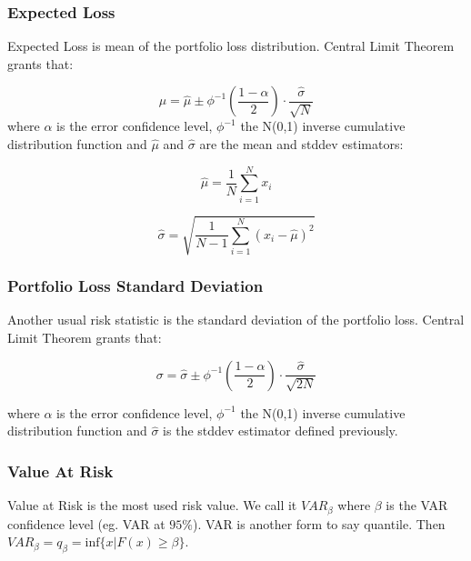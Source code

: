 \documentclass[a4paper,12pt,final]{article}
\begin{document}
\subsubsection{Expected Loss}
Expected Loss is mean of the portfolio loss distribution.
Central Limit Theorem \cite{stats:schaum} grants that:

\begin{displaymath}
\mu = \widehat{\mu} \pm \phi^{-1}\left(\frac{1-\alpha}{2}\right) \cdot \frac{\widehat{\sigma}}{\sqrt{N}}
\end{displaymath}
where $\alpha$ is the error confidence level, $\phi^{-1}$ the N(0,1) inverse 
cumulative distribution function and $\widehat{\mu}$ and $\widehat{\sigma}$ are 
the mean and stddev estimators:

\begin{displaymath}
\widehat{\mu} = \frac{1}{N} \sum_{i=1}^{N} x_i
\end{displaymath}

\begin{displaymath}
\widehat{\sigma} =
\sqrt{\frac{1}{N-1} \sum_{i=1}^{N} \left( x_i - \widehat{\mu} \right)^2}
\end{displaymath}

\subsubsection{Portfolio Loss Standard Deviation}
Another usual risk statistic is the standard deviation of the portfolio loss.
Central Limit Theorem \cite{stats:schaum} grants that:

\begin{displaymath}
\sigma = \widehat{\sigma} \pm \phi^{-1}\left(\frac{1-\alpha}{2}\right) \cdot \frac{\widehat{\sigma}}{\sqrt{2N}}
\end{displaymath}

where $\alpha$ is the error confidence level, $\phi^{-1}$ the N(0,1) inverse 
cumulative distribution function and $\widehat{\sigma}$ is the stddev estimator
defined previously.

\subsubsection{Value At Risk}
Value at Risk \cite{var:jorion} is the most used risk value. We call it 
$VAR_{\beta}$ where $\beta$ is the VAR confidence level (eg. VAR at $95\%$).
VAR is another form to say quantile. Then
$VAR_{\beta} = q_{\beta} = \textrm{inf}\{x | F(x) \geq \beta \}$. 
\end{document}
